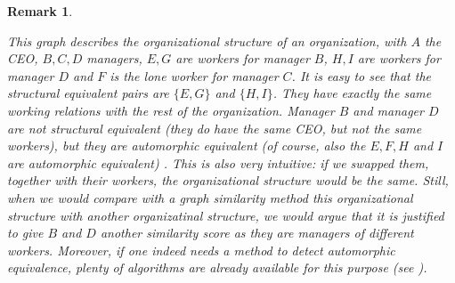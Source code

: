\documentclass[a4paper,11pt]{report}
\newtheorem{remark}[theorem]{Remark}
\begin{document}
\begin{itemize}
\begin{remark}
\begin{center}

\end{center}
This graph describes the organizational structure of an organization, with $A$ the CEO, $B, C, D$ managers, $E, G$ are workers for manager $B$, $H, I$ are workers for manager $D$ and $F$ is the lone worker for
manager $C$. It is easy to see that the structural equivalent pairs are $\{E, G\}$ and $\{H, I\}$. They have exactly
the same working relations with the rest of the organization. Manager $B$ and manager $D$ are not structural
equivalent (they do have the same CEO, but not the same workers), but they are automorphic equivalent (of course, also
the $E, F, H$ and $I$ are automorphic equivalent) . This is also
very intuitive: if we swapped them, together with their workers, the organizational structure would be the same. Still, when we would compare with a graph similarity method this organizational structure with another organizatinal structure, we would argue that it is justified to give $B$ and $D$ another similarity score as they are managers
of different workers. Moreover, if one indeed needs a method to detect automorphic equivalence, plenty of algorithms
are already available for this purpose (see \cite{regulareq}).


\end{remark}
\end{itemize}
\end{document}
